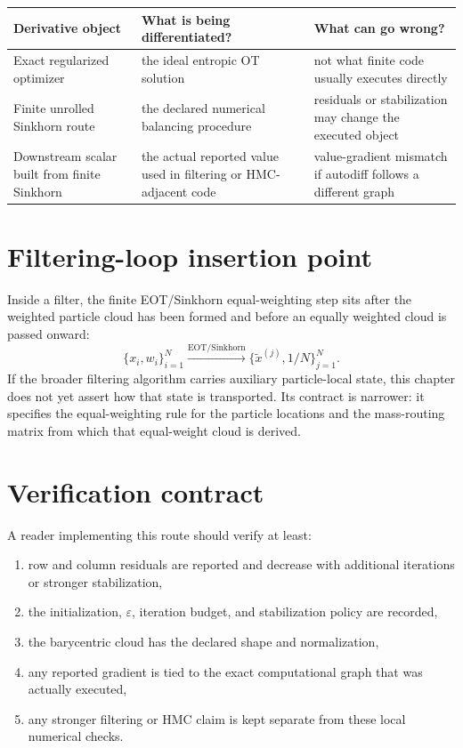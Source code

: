 \begin{center}
\small
\begin{tabular}{p{} p{} p{}}
\toprule
Derivative object & What is being differentiated? & What can go wrong? \\
\midrule
Exact regularized optimizer & the ideal entropic OT solution & not what finite code usually executes directly \\
Finite unrolled Sinkhorn route & the declared numerical balancing procedure & residuals or stabilization may change the executed object \\
Downstream scalar built from finite Sinkhorn & the actual reported value used in filtering or HMC-adjacent code & value-gradient mismatch if autodiff follows a different graph \\
\bottomrule
\end{tabular}
\end{center}

\section{Filtering-loop insertion point}
\label{sec:bf-eot-loop}

Inside a filter, the finite EOT/Sinkhorn equal-weighting step sits after the
weighted particle cloud has been formed and before an equally weighted cloud is
passed onward:
\begin{equation}
\label{eq:bf-eot-loop}
  \{x_i,w_i\}_{i=1}^N
  \xrightarrow{\mathrm{EOT/Sinkhorn}}
  \{\tilde x^{(j)},1/N\}_{j=1}^N.
\end{equation}
If the broader filtering algorithm carries auxiliary particle-local state, this
chapter does not yet assert how that state is transported.  Its contract is
narrower: it specifies the equal-weighting rule for the particle locations and the
mass-routing matrix from which that equal-weight cloud is derived.

\section{Verification contract}
\label{sec:bf-eot-verification}

A reader implementing this route should verify at least:
\begin{enumerate}[label=(\arabic*)]
  \item row and column residuals are reported and decrease with additional
  iterations or stronger stabilization,
  \item the initialization, \(\varepsilon\), iteration budget, and stabilization
  policy are recorded,
  \item the barycentric cloud has the declared shape and normalization,
  \item any reported gradient is tied to the exact computational graph that was
  actually executed,
  \item any stronger filtering or HMC claim is kept separate from these local
  numerical checks.
\end{enumerate}

